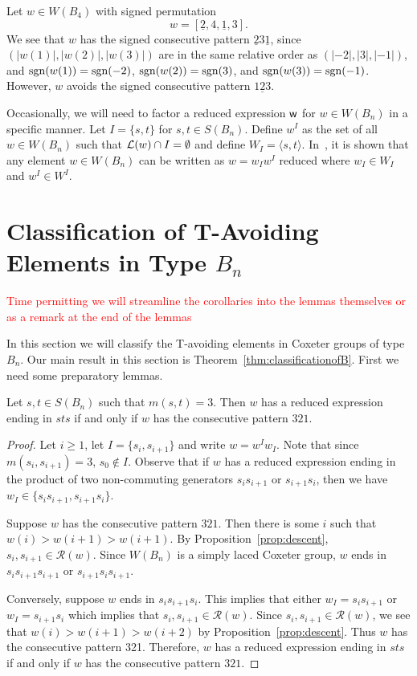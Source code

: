 \begin{example}
Let $w \in W(B_4)$ with signed permutation \[w=[\underline{2},4, \underline{1}, 3].\] We see that $w$ has the signed consecutive pattern $\underline{2} 3 \underline{1}$, since $(|w(1)|, |w(2)|, |w(3)|)$ are in the same relative order as $(|-2|, |3|, |-1|)$, and $\mathrm{sgn}(w(1))=\mathrm{sgn}(-2)$, $\mathrm{sgn}(w(2))=\mathrm{sgn}(3)$, and $\mathrm{sgn}(w(3))=\mathrm{sgn}(-1)$. However, $w$ avoids the signed consecutive pattern $1\underline{2}3$.
\end{example}

Occasionally, we will need to factor a reduced expression $\mathsf{w}$ for $w \in W(B_n)$ in a specific manner. Let $I=\{s,t\}$ for $s, t \in S(B_n)$. Define $w^I$ as the set of all $w \in W(B_n)$ such that $\mathcal{L}(w) \cap I= \emptyset$ and define $W_I=\langle s,t \rangle$. In~\cite{Humphreys1990}, it is shown that any element $w \in W(B_n)$ can be written as $w=w_Iw^I$ reduced where $w_I \in W_I$ and $w^I \in W^I$.

\section{Classification of T-Avoiding Elements in Type $B_n$}\label{sec:TAB}

\textcolor{red}{Time permitting we will streamline the corollaries into the lemmas themselves or as a remark at the end of the lemmas}

In this section we will classify the T-avoiding elements in Coxeter groups of type $B_n$. Our main result in this section is Theorem~\ref{thm:classificationofB}. First we need some preparatory lemmas. 

\begin{lemma}\label{lem:sts}
Let $s,t \in S(B_n)$ such that $m(s,t)=3$. Then $w$ has a reduced expression ending in $sts$ if and only if $w$ has the consecutive pattern $321$.
\begin{proof}
	Let $i \geq 1$, let $I=\{s_i,s_{i+1}\}$ and write $w=w^Iw_I$. Note that since $m(s_i,s_{i+1})=3$, $s_0 \notin I$. Observe that if $w$ has a reduced expression ending in the product of two non-commuting generators $s_is_{i+1}$ or $s_{i+1}s_i$, then we have $w_I \in \{s_is_{i+1}, s_{i+1}s_i\}$.
	
	Suppose $w$ has the consecutive pattern $321$. Then there is some $i$ such that $w(i) > w(i+1) > w(i+1)$. By Proposition~\ref{prop:descent}, $s_i,s_{i+1} \in \mathcal{R}(w)$. Since $W(B_n)$ is a simply laced Coxeter group, $w$ ends in $s_is_{i+1}s_{i+1}$ or $s_{i+1}s_is_{i+1}$.
	
	Conversely, suppose $w$ ends in $s_is_{i+1}s_i$. This implies that either $w_I=s_is_{i+1}$ or $w_I=s_{i+1}s_i$ which implies that $s_i,s_{i+1} \in \mathcal{R}(w)$. Since $s_i,s_{i+1} \in \mathcal{R}(w)$, we see that $w(i)>w(i+1)>w(i+2)$ by Proposition~\ref{prop:descent}. Thus $w$ has the consecutive pattern 321.
	Therefore, $w$ has a reduced expression ending in $sts$ if and only if $w$ has the consecutive pattern $321$. 
\end{proof}	
\end{lemma}

